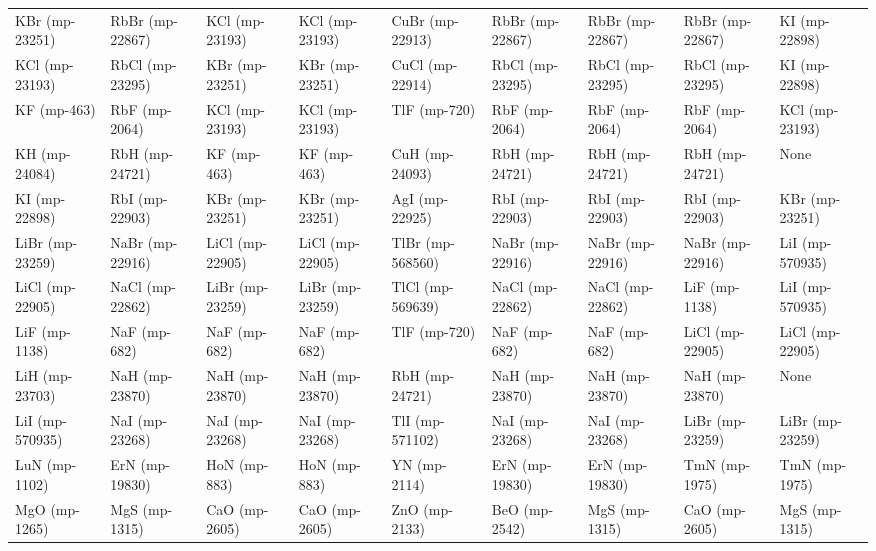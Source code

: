\begin{longtable}{lllllllll}
   KBr (mp-23251) &   RbBr (mp-22867) &      KCl (mp-23193) &    KCl (mp-23193) &     CuBr (mp-22913) &   RbBr (mp-22867) &   RbBr (mp-22867) &   RbBr (mp-22867) &     KI (mp-22898) \\
   KCl (mp-23193) &   RbCl (mp-23295) &      KBr (mp-23251) &    KBr (mp-23251) &     CuCl (mp-22914) &   RbCl (mp-23295) &   RbCl (mp-23295) &   RbCl (mp-23295) &     KI (mp-22898) \\
      KF (mp-463) &     RbF (mp-2064) &      KCl (mp-23193) &    KCl (mp-23193) &        TlF (mp-720) &     RbF (mp-2064) &     RbF (mp-2064) &     RbF (mp-2064) &    KCl (mp-23193) \\
    KH (mp-24084) &    RbH (mp-24721) &         KF (mp-463) &       KF (mp-463) &      CuH (mp-24093) &    RbH (mp-24721) &    RbH (mp-24721) &    RbH (mp-24721) &              None \\
    KI (mp-22898) &    RbI (mp-22903) &      KBr (mp-23251) &    KBr (mp-23251) &      AgI (mp-22925) &    RbI (mp-22903) &    RbI (mp-22903) &    RbI (mp-22903) &    KBr (mp-23251) \\
  LiBr (mp-23259) &   NaBr (mp-22916) &     LiCl (mp-22905) &   LiCl (mp-22905) &    TlBr (mp-568560) &   NaBr (mp-22916) &   NaBr (mp-22916) &   NaBr (mp-22916) &   LiI (mp-570935) \\
  LiCl (mp-22905) &   NaCl (mp-22862) &     LiBr (mp-23259) &   LiBr (mp-23259) &    TlCl (mp-569639) &   NaCl (mp-22862) &   NaCl (mp-22862) &     LiF (mp-1138) &   LiI (mp-570935) \\
    LiF (mp-1138) &      NaF (mp-682) &        NaF (mp-682) &      NaF (mp-682) &        TlF (mp-720) &      NaF (mp-682) &      NaF (mp-682) &   LiCl (mp-22905) &   LiCl (mp-22905) \\
   LiH (mp-23703) &    NaH (mp-23870) &      NaH (mp-23870) &    NaH (mp-23870) &      RbH (mp-24721) &    NaH (mp-23870) &    NaH (mp-23870) &    NaH (mp-23870) &              None \\
  LiI (mp-570935) &    NaI (mp-23268) &      NaI (mp-23268) &    NaI (mp-23268) &     TlI (mp-571102) &    NaI (mp-23268) &    NaI (mp-23268) &   LiBr (mp-23259) &   LiBr (mp-23259) \\
    LuN (mp-1102) &    ErN (mp-19830) &        HoN (mp-883) &      HoN (mp-883) &        YN (mp-2114) &    ErN (mp-19830) &    ErN (mp-19830) &     TmN (mp-1975) &     TmN (mp-1975) \\
    MgO (mp-1265) &     MgS (mp-1315) &       CaO (mp-2605) &     CaO (mp-2605) &       ZnO (mp-2133) &     BeO (mp-2542) &     MgS (mp-1315) &     CaO (mp-2605) &     MgS (mp-1315) \\

\end{longtable}

